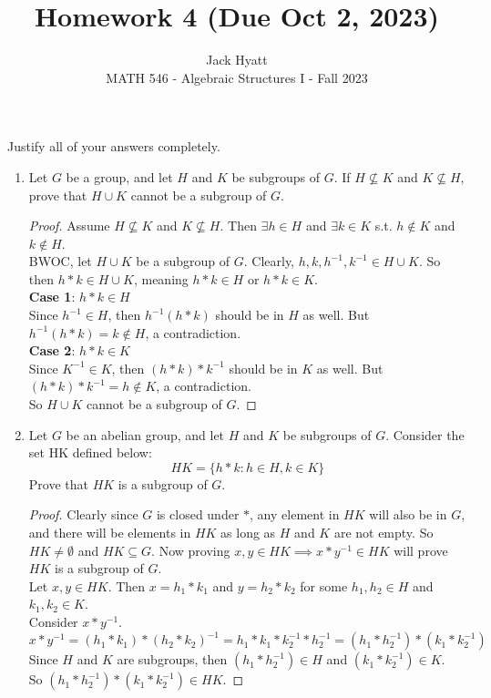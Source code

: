 \documentclass[12pt]{article}
\begin{document}
	
	
	
	\title{Homework 4 (Due Oct 2, 2023)}
	\author{Jack Hyatt\\ %
		MATH 546 - Algebraic Structures I - Fall 2023} 
	
	\maketitle
	
	Justify all of your answers completely.\\
	
	
	\medskip 
	
	\begin{enumerate}
		\item Let $G$ be a group, and let $H$ and $K$ be subgroups of $G$. If $H \nsubseteq K$ and $K \nsubseteq H$, prove that $H \cup K$ cannot be a subgroup of $G$.
		\begin{proof}
			Assume $H \nsubseteq K$ and $K \nsubseteq H$. Then $\exists h \in H$ and $\exists k \in K$ s.t. $h \nin K$ and $k \nin H$.\\
			BWOC, let $H \cup K$ be a subgroup of $G$. Clearly, $h,k,h^{-1},k^{-1}\in H \cup K$. So then $h*k \in H \cup K$, meaning $h*k \in H$ or $h*k \in K$.\\
			\textbf{Case 1}: $h*k \in H$\\
			Since $h^{-1} \in H$, then $h^{-1}(h*k)$ should be in $H$ as well. But $h^{-1}(h*k) = k \nin H$, a contradiction.\\
			\textbf{Case 2}: $h*k \in K$\\
			Since $K^{-1} \in K$, then $(h*k)*k^{-1}$ should be in $K$ as well. But $(h*k)*k^{-1} = h \nin K$, a contradiction.\\
			So $H \cup K$ cannot be a subgroup of $G$.
		\end{proof}
		
		\item Let $G$ be an abelian group, and let $H$ and $K$ be subgroups of $G$. Consider the set HK defined below:
		\[HK = \{h*k : h \in H, k \in K\}\]
		Prove that $HK$ is a subgroup of $G$.
		\begin{proof}
			Clearly since $G$ is closed under $*$, any element in $HK$ will also be in $G$, and there will be elements in $HK$ as long as $H$ and $K$ are not empty. So $HK \neq \emptyset$ and $HK \subseteq G$. Now proving $x,y \in HK \implies x*y^{-1} \in HK$ will prove $HK$ is a subgroup of $G$.\\
			Let $x,y \in HK$. Then $x = h_1 * k_1$ and $y = h_2 * k_2$ for some $h_1,h_2 \in H$ and $k_1,k_2 \in K$.\\
			Consider $x * y^{-1}$.
			\[x * y^{-1} = (h_1*k_1) * (h_2*k_2)^{-1} = h_1*k_1 * k_2^{-1}*h_2^{-1} = (h_1*h_2^{-1}) * (k_1*k_2^{-1})\]
			Since $H$ and $K$ are subgroups, then $(h_1*h_2^{-1}) \in H$ and $(k_1*k_2^{-1}) \in K$.\\
			So $(h_1*h_2^{-1}) * (k_1*k_2^{-1}) \in HK$.
		\end{proof}
		

\end{enumerate}
\end{document}
